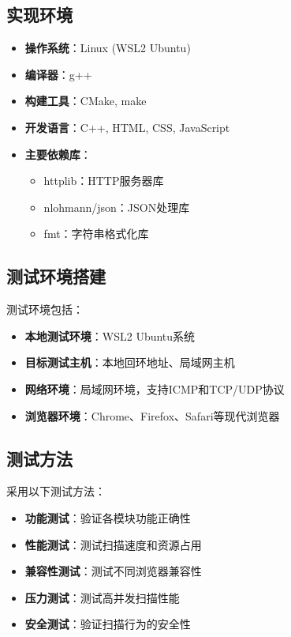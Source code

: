 \documentclass[12pt,hyperref,a4paper,UTF8]{ctexart}
\begin{document}
\subsection{实现环境}
\begin{itemize}
    \item \textbf{操作系统}：Linux (WSL2 Ubuntu)
    \item \textbf{编译器}：g++
    \item \textbf{构建工具}：CMake, make
    \item \textbf{开发语言}：C++, HTML, CSS, JavaScript
    \item \textbf{主要依赖库}：
    \begin{itemize}
        \item httplib：HTTP服务器库
        \item nlohmann/json：JSON处理库
        \item fmt：字符串格式化库
    \end{itemize}
\end{itemize}

\subsection{测试环境搭建}
测试环境包括：
\begin{itemize}
    \item \textbf{本地测试环境}：WSL2 Ubuntu系统
    \item \textbf{目标测试主机}：本地回环地址、局域网主机
    \item \textbf{网络环境}：局域网环境，支持ICMP和TCP/UDP协议
    \item \textbf{浏览器环境}：Chrome、Firefox、Safari等现代浏览器
\end{itemize}

\subsection{测试方法}
采用以下测试方法：
\begin{itemize}
    \item \textbf{功能测试}：验证各模块功能正确性
    \item \textbf{性能测试}：测试扫描速度和资源占用
    \item \textbf{兼容性测试}：测试不同浏览器兼容性
    \item \textbf{压力测试}：测试高并发扫描性能
    \item \textbf{安全测试}：验证扫描行为的安全性
\end{itemize}
\end{document}
